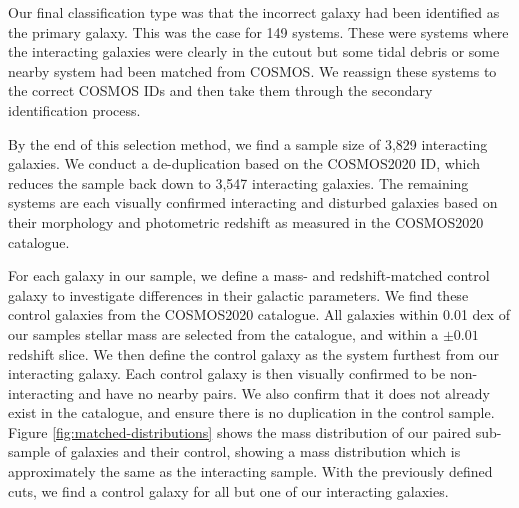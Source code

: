 Our final classification type was that the incorrect galaxy had been identified as the primary galaxy. This was the case for 149 systems. These were systems where the interacting galaxies were clearly in the cutout but some tidal debris or some nearby system had been matched from COSMOS. We reassign these systems to the correct COSMOS IDs and then take them through the secondary identification process.

By the end of this selection method, we find a sample size of 3,829 interacting galaxies. We conduct a de-duplication based on the COSMOS2020 ID, which reduces the sample back down to 3,547 interacting galaxies. The remaining systems are each visually confirmed interacting and disturbed galaxies based on their morphology and photometric redshift as measured in the COSMOS2020 catalogue.

For each galaxy in our sample, we define a mass- and redshift-matched control galaxy to investigate differences in their galactic parameters. We find these control galaxies from the COSMOS2020 catalogue. All galaxies within 0.01 dex of our samples stellar mass are selected from the catalogue, and within a $\pm0.01$ redshift slice. We then define the control galaxy as the system furthest from our interacting galaxy. Each control galaxy is then visually confirmed to be non-interacting and have no nearby pairs. We also confirm that it does not already exist in the catalogue, and ensure there is no duplication in the control sample. Figure \ref{fig:matched-distributions} shows the mass distribution of our paired sub-sample of galaxies and their control, showing a mass distribution which is approximately the same as the interacting sample. With the previously defined cuts, we find a control galaxy for all but one of our interacting galaxies.

